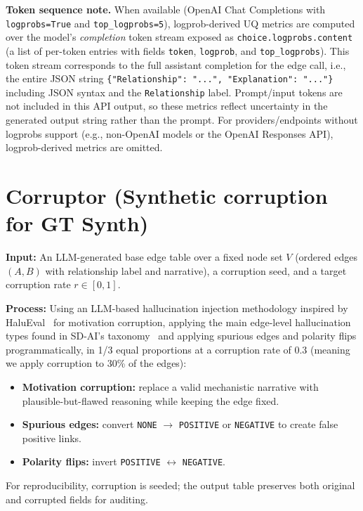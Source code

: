 \noindent\textbf{Token sequence note.} When available (OpenAI Chat Completions with \texttt{logprobs=True} and \texttt{top\_logprobs=5}), logprob-derived UQ metrics are computed over the model's \emph{completion} token stream exposed as \texttt{choice.logprobs.content} (a list of per-token entries with fields \texttt{token}, \texttt{logprob}, and \texttt{top\_logprobs}). This token stream corresponds to the full assistant completion for the edge call, i.e., the entire JSON string \texttt{\{"Relationship": "...", "Explanation": "..."\}} including JSON syntax and the \texttt{Relationship} label. Prompt/input tokens are not included in this API output, so these metrics reflect uncertainty in the generated output string rather than the prompt. For providers/endpoints without logprobs support (e.g., non-OpenAI models or the OpenAI Responses API), logprob-derived metrics are omitted.

\section{Corruptor (Synthetic corruption for GT Synth)}
\label{sec:corruptor}

\textbf{Input:} An LLM-generated base edge table over a fixed node set \(V\) (ordered edges \((A,B)\) with relationship label and narrative), a corruption seed, and a target corruption rate \(r\in[0,1]\).

\textbf{Process:} Using an LLM-based hallucination injection methodology inspired by HaluEval~\cite{li2023halueval} for motivation corruption, applying the main edge-level hallucination types found in SD-AI's taxonomy~\cite{schoenberg2025aibuildsdmodels} and applying spurious edges and polarity flips programmatically, in 1/3 equal proportions at a corruption rate of 0.3 (meaning we apply corruption to 30\% of the edges):
\begin{itemize}[noitemsep]
    \item \textbf{Motivation corruption:} replace a valid mechanistic narrative with plausible-but-flawed reasoning while keeping the edge fixed.
    \item \textbf{Spurious edges:} convert \texttt{NONE} $\rightarrow$ \texttt{POSITIVE} or \texttt{NEGATIVE} to create false positive links.
    \item \textbf{Polarity flips:} invert \texttt{POSITIVE} $\leftrightarrow$ \texttt{NEGATIVE}.
\end{itemize}
For reproducibility, corruption is seeded; the output table preserves both original and corrupted fields for auditing.

